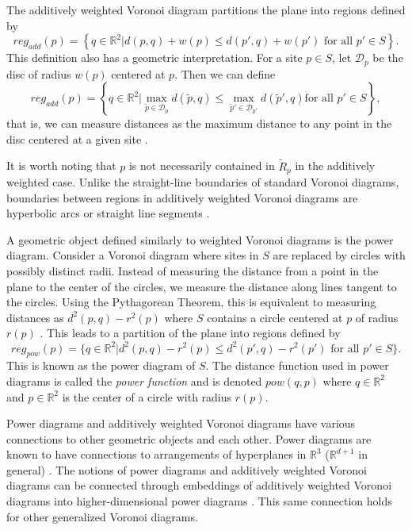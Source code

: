 \documentclass[12pt]{article}
\newcommand{\R}{\mathbb{R}}
\begin{document}
The additively weighted Voronoi diagram partitions the plane into regions defined by
\begin{equation*}
  reg_{add}(p) = \left\{ q \in \R^2 | d(p,q) + w(p) \leq d(p',q) + w(p') \text{ for all } p' \in S \right\}.
\end{equation*}
This definition also has a geometric interpretation. For a site $p \in S$, let $\mathcal{D}_p$ be the disc of radius $w(p)$ centered at $p$. Then we
can define
\begin{equation*}
  reg_{add}(p) = \left\{ q \in \R^2 | \max_{\tilde{p} \in \mathcal{D}_p} d(\tilde{p}, q) \leq \max_{\tilde{p}' \in \mathcal{D}_{p'}} d(\tilde{p}', q) \text{
  for all } p' \in S \right\},
\end{equation*}
that is, we can measure distances as the maximum distance to any point in the disc centered at a given site \cite{rosenberger_additive}.

It is worth noting that $p$ is not necessarily contained in $\tilde{R}_p$ in the additively weighted case. Unlike the straight-line boundaries of standard
Voronoi diagrams, boundaries between regions in additively weighted Voronoi diagrams are hyperbolic arcs or straight line segments \cite{aurenhammer_additive}.

A geometric object defined similarly to weighted Voronoi diagrams is the power diagram. Consider a Voronoi diagram where sites in $S$ are replaced by
circles with possibly distinct radii. Instead of measuring the distance from a point in the plane to the center of the circles, we measure the distance
along lines tangent to the circles. Using the Pythagorean Theorem, this is equivalent to measuring distances as $d^2(p,q) -
r^2(p)$ where $S$ contains a circle centered at $p$ of radius $r(p)$ \cite{aurenhammer_power}. This leads to a partition of the plane into regions defined by
\begin{equation*}
  reg_{pow}(p) = \{ q \in \R^2 | d^2(p,q) - r^2(p) \leq d^2(p',q) - r^2(p') \text{ for all } p' \in S \}.
\end{equation*}
This is known as the power diagram of $S$. The distance function used in power diagrams is called the \textit{power function} and is denoted
$pow(q,p)$ where $q \in \R^2$ and $p \in \R^2$ is the center of a circle with radius $r(p)$.

Power diagrams and additively weighted Voronoi diagrams have various connections to other geometric objects and each other.
Power diagrams are known to have connections to arrangements of hyperplanes in $\R^3$ ($\R^{d+1}$ in general) \cite{aurenhammer_survey}. The notions
of power diagrams and additively weighted Voronoi diagrams can be connected through embeddings of additively weighted Voronoi diagrams into
higher-dimensional power diagrams \cite{aurenhammer_additive}. This same connection holds for other generalized Voronoi diagrams.
\end{document}

